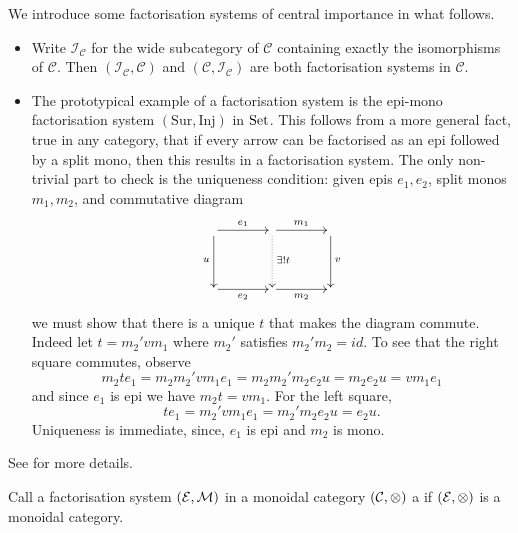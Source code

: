 \begin{examples}
  We introduce some factorisation systems of central importance in what follows.
  \begin{itemize}
    \item Write $\mathcal I_{\mathcal C}$ for the wide subcategory of
      $\mathcal C$ containing exactly the isomorphisms of $\mathcal C$. Then
      $(\mathcal I_{\mathcal C}, \mathcal C)$ and $(\mathcal C, \mathcal
      I_{\mathcal C})$ are both factorisation systems in $\mathcal C$. 
    
    \item The prototypical example of a factorisation system is the epi-mono
      factorisation system $(\mathrm{Sur},\mathrm{Inj})$ in $\mathrm{Set}$. This follows
      from a more general fact, true in any category, that if every arrow can be
      factorised as an epi followed by a split mono, then this results in a
      factorisation system.  The only non-trivial part to check is the
      uniqueness condition: given epis $e_1,e_2$, split monos $m_1,m_2$, and
      commutative diagram
      \[
	\xymatrixcolsep{3pc}
	\xymatrixrowsep{3pc}
	\xymatrix{
	  \ar[r]^{e_1} \ar[d]_u & \ar[r]^{m_1} \ar@{.>}[d]^{\exists! t} &
	  \ar[d]^v \\
	  \ar[r]_{e_2}& \ar[r]_{m_2} & 
	}
      \]
      we must show that there is a unique $t$ that makes the diagram commute.
      Indeed let $t= m_2'vm_1$ where $m_2'$ satisfies $m_2'm_2=id$. 
      To see that the right square commutes, observe
      \[
	m_2 t e_1 =  m_2 m_2' v m_1 e_1 = m_2 m_2' m_2 e_2 u = m_2 e_2 u = v m_1 e_1
      \]
      and since $e_1$ is epi we have $m_2 t = v m_1$. For the left square,
      \[
	t e_1 = m_2' v m_1 e_1 = m_2' m_2 e_2 u = e_2 u.
      \] 
      Uniqueness is immediate, since, $e_1$ is epi and $m_2$ is mono. 
\end{itemize}
\end{examples}

See \cite[]{AHS} for more details.

\begin{definition}
Call a factorisation system $(\mathcal E,\mathcal M)$ in a monoidal category $(\mathcal C,\otimes)$
a  if $(\mathcal E,\otimes)$ is a monoidal
category.
\end{definition}

